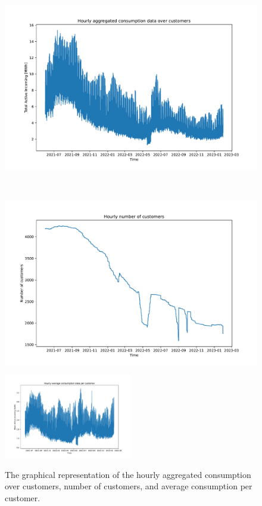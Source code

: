 \begin{figure}[H]
\begin{minipage}[b]{8.5cm}
\centering
\includegraphics[width=1\textwidth]{images/demand/data_plot}
\subcaption{}
\label{fig:demanddataplot}
\end{minipage}
\ \hspace{2mm} \
\begin{minipage}[b]{8.5cm}
\centering
\includegraphics[width=1\textwidth]{images/demand/customers_plot}
\subcaption{}
\label{fig:customersplot}
\end{minipage}
\begin{minipage}[b]{17cm}
\centering
\includegraphics[width=0.5\textwidth]{images/demand/mean_data_plot}
\subcaption{}
\label{fig:meandemanddataplot}
\end{minipage}
\caption{The graphical representation of the hourly  aggregated consumption over customers,  number of customers, and  average consumption per customer.}
\end{figure}

